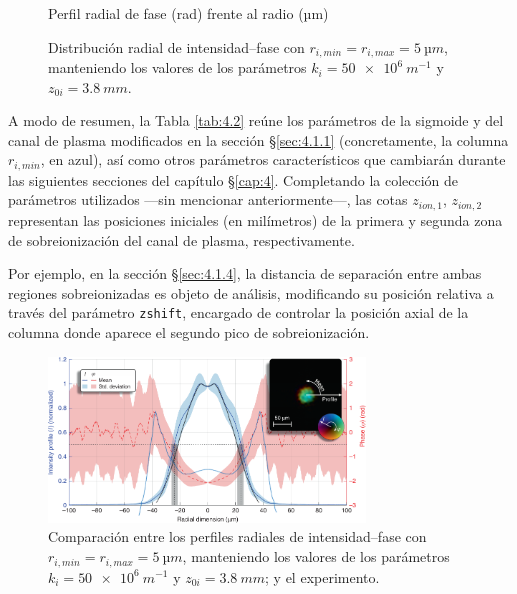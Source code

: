 \begin{figure}[htbp]
\begin{subcaptionblock}{.4\textwidth}
    \caption{Perfil radial de fase (\unit{rad}) frente al radio (\unit{µm})}\label{fig:ch4_fs05}
  \end{subcaptionblock}
   \caption{Distribución radial de intensidad--fase con $r_{i,min}=r_{i,max}=\qty{5}{µm}$, manteniendo los valores de los parámetros $k_{i}=\qty{50e6}{m^{-1}}$ y $z_{0i}=\qty{3.8}{mm}$.}
   \label{fig:4.8}
\end{figure}

A modo de resumen, la Tabla \ref{tab:4.2} reúne los parámetros de la sigmoide y del canal de plasma modificados en la sección \S\ref{sec:4.1.1} (concretamente, la columna $r_{i,min}$, en azul), así como otros parámetros característicos que cambiarán durante las siguientes secciones del capítulo \S\ref{cap:4}. Completando la colección de parámetros utilizados ---sin mencionar anteriormente---, las cotas $z_{ion,1}$, $z_{ion,2}$ representan las posiciones iniciales (en milímetros) de la primera y segunda zona de sobreionización del canal de plasma, respectivamente.

Por ejemplo, en la sección \S\ref{sec:4.1.4}, la distancia de separación entre ambas regiones sobreionizadas es objeto de análisis, modificando su posición relativa a través del parámetro \texttt{zshift}, encargado de controlar la posición axial de la columna donde aparece el segundo pico de sobreionización.

\begin{figure}[htbp]
  \centering
  \includegraphics[width=0.75\textwidth]{Figuras/ch4_cmp05.png}
  \caption{Comparación entre los perfiles radiales de intensidad--fase con $r_{i,min}=r_{i,max}=\qty{5}{µm}$, manteniendo los valores de los parámetros $k_{i}=\qty{50e6}{m^{-1}}$ y $z_{0i}=\qty{3.8}{mm}$; y el experimento.}
  \label{fig:4.9}
\end{figure}

